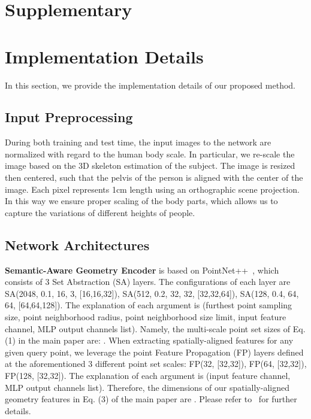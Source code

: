 \documentclass[10pt,twocolumn,letterpaper]{article}
\begin{document}
\clearpage

\appendix

\section*{Supplementary}

\section{Implementation Details}

In this section, we provide the implementation details of our proposed method.

\subsection{Input Preprocessing}

During both training and test time, the input images to the network are normalized with regard to the human body scale. In particular, we re-scale the image based on the 3D skeleton estimation of the subject.
The image is resized then centered, such that the pelvis of the person is aligned with the center of the image. Each pixel represents \num{1}cm length using an orthographic scene projection. In this way we ensure proper scaling of the body parts, which allows us to capture the variations of different heights of people.

\subsection{Network Architectures}

\textbf{Semantic-Aware Geometry Encoder} is based on PointNet++~\cite{qi2017pointnet++,qi2017pointnet}, which consists of 3 Set Abstraction (SA) layers. The configurations of each layer are SA(2048, 0.1, 16, 3, [16,16,32]), SA(512, 0.2, 32, 32, [32,32,64]), SA(128, 0.4, 64, 64, [64,64,128]). The explanation of each argument is (furthest point sampling size, point neighborhood radius, point neighborhood size limit, input feature channel, MLP output channels list). Namely, the multi-scale point set sizes of Eq. (1) in the main paper are: . When extracting spatially-aligned features for any given query point, we leverage the point Feature Propagation (FP) layers defined at the aforementioned 3 different point set scales: FP(32, [32,32]), FP(64, [32,32]), FP(128, [32,32]). The explanation of each argument is (input feature channel, MLP output channels list). Therefore, the dimensions of our spatially-aligned geometry features  in Eq. (3) of the main paper are . Please refer to~\cite{qi2017pointnet++} for further details.
\end{document}
